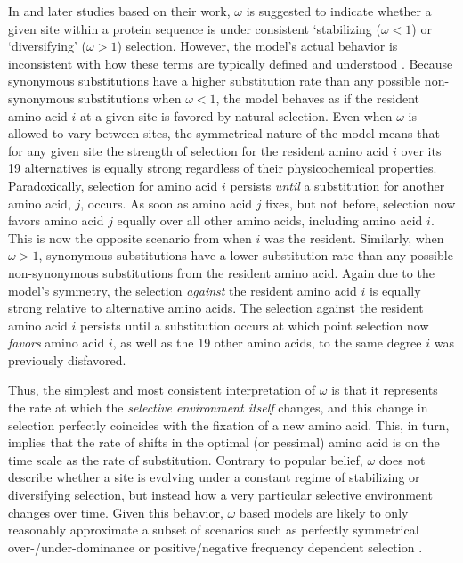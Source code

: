 \documentclass[12pt,letterpaper,fleqn]{article}
\newcommand{\PC}{physicochemical\xspace}
\begin{document}
In \citet{GoldmanAndYang1994,YangAndNielsen1998,NielsenAndYang1998} and later studies based on their work, $\omega$ is suggested to indicate whether a given site within a protein sequence is under consistent `stabilizing ($\omega < 1$) or `diversifying' ($\omega > 1$) selection.
However, the model's actual behavior is inconsistent with how these terms are typically defined and understood \citep[e.g.~see][]{Pellmyr2002}. %
Because synonymous substitutions have a higher substitution rate than any possible non-synonymous substitutions when $\omega < 1$, the model behaves as if the resident amino acid $i$ at a given site is favored by natural selection.
Even when $\omega$ is allowed to vary between sites, the symmetrical nature of the model means that for any given site the strength of selection for the resident amino acid $i$ over its 19 alternatives is equally strong regardless of their \PC properties.
Paradoxically, selection for amino acid $i$ persists \emph{until} a substitution for another amino acid, $j$, occurs.
As soon as amino acid $j$ fixes, but not before, selection now favors amino acid $j$ equally over all other amino acids, including amino acid $i$.
This is now the opposite scenario from when $i$ was the resident.
Similarly, when $\omega > 1$, synonymous substitutions have a lower substitution rate than any possible non-synonymous substitutions from the resident amino acid.
Again due to the model's symmetry, the selection \emph{against} the resident amino acid $i$ is equally strong relative to alternative amino acids.
The selection against the resident amino acid $i$ persists until a substitution occurs at which point selection now \emph{favors} amino acid $i$, as well as the 19 other amino acids, to the same degree $i$ was previously disfavored.

Thus, the simplest and most consistent interpretation of $\omega$ is that it represents the rate at which the \emph{selective environment itself} changes, and this change in selection perfectly coincides with the fixation of a new amino acid.
This, in turn, implies that the rate of shifts in the optimal (or pessimal) amino acid is on the time scale as the rate of substitution.
Contrary to popular belief, $\omega$ does not describe whether a site is evolving under a constant regime of stabilizing or diversifying selection, but instead how a very particular selective environment changes over time.
Given this behavior, $\omega$ based models are likely to only reasonably approximate a subset of scenarios such as perfectly symmetrical over-/under-dominance or positive/negative frequency dependent selection \citep{HughesAndNei1988,Nowak2006}.
\end{document}
